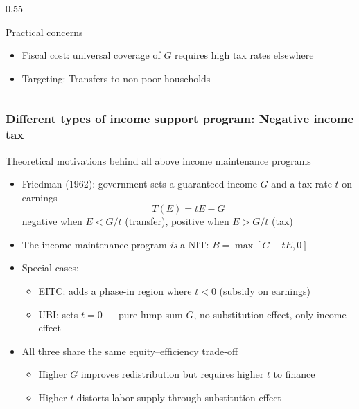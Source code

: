\documentclass[aspectratio=169]{beamer}
\begin{document}
\begin{frame}
\begin{columns}
\begin{column}{0.55\textwidth}
\begin{itemize}
\end{itemize} \medskip
Practical concerns
    \begin{itemize}\setlength\itemsep{3pt}
        \item Fiscal cost: universal coverage of $G$ requires high tax rates
        elsewhere
        \item Targeting: Transfers to non-poor
        households
    \end{itemize}
\end{column}
\end{columns}
\end{frame}

\begin{frame}
\frametitle{Different types of income support program: Negative income tax} 
Theoretical motivations behind all above income maintenance programs
\begin{itemize}\setlength\itemsep{3pt}
    \item Friedman (1962): government sets a guaranteed
    income $G$ and a tax rate $t$ on earnings
    \[
    T(E) = tE - G
    \]
    negative when $E < G/t$ (transfer), positive when
    $E > G/t$ (tax)
    \item The income maintenance program \textit{is} a NIT:
    $B = \max[G - tE, 0]$
    \item Special cases:
    \begin{itemize}\setlength\itemsep{3pt}
        \item EITC: adds a phase-in region where $t < 0$
        (subsidy on earnings) 
        \item UBI: sets $t = 0$ --- pure lump-sum $G$,
        no substitution effect, only income effect
    \end{itemize}
    \item All three share the same equity--efficiency trade-off 
    \begin{itemize}\setlength\itemsep{3pt}
        \item Higher $G$ improves redistribution but requires higher $t$ to finance
        \item Higher $t$ distorts labor supply through substitution effect
    \end{itemize}
\end{itemize}
\end{frame}
\end{document}
